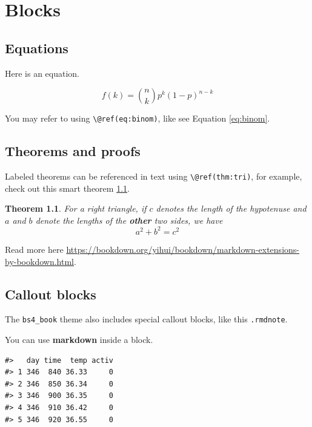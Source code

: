 \documentclass[
  12pt,
  a4paper,
  extrafontsizes,
  onecolumn,
  openright]{book}
\newtheorem{theorem}{Theorem}[chapter]
\theoremstyle{definition}
\theoremstyle{definition}
\theoremstyle{definition}
\theoremstyle{definition}
\theoremstyle{remark}
\begin{document}
\hypertarget{blocks}{%
\chapter{Blocks}\label{blocks}}

\hypertarget{equations}{%
\section{Equations}\label{equations}}

Here is an equation.

\begin{equation} 
  f\left(k\right) = \binom{n}{k} p^k\left(1-p\right)^{n-k}
  \label{eq:binom}
\end{equation}

You may refer to using \texttt{\textbackslash{}@ref(eq:binom)}, like see Equation \eqref{eq:binom}.

\hypertarget{theorems-and-proofs}{%
\section{Theorems and proofs}\label{theorems-and-proofs}}

Labeled theorems can be referenced in text using \texttt{\textbackslash{}@ref(thm:tri)}, for example, check out this smart theorem \ref{thm:tri}.

\begin{theorem}
\protect\hypertarget{thm:tri}{}\label{thm:tri}For a right triangle, if \(c\) denotes the \emph{length} of the hypotenuse
and \(a\) and \(b\) denote the lengths of the \textbf{other} two sides, we have
\[a^2 + b^2 = c^2\]
\end{theorem}

Read more here \url{https://bookdown.org/yihui/bookdown/markdown-extensions-by-bookdown.html}.

\hypertarget{callout-blocks}{%
\section{Callout blocks}\label{callout-blocks}}

The \texttt{bs4\_book} theme also includes special callout blocks, like this \texttt{.rmdnote}.

You can use \textbf{markdown} inside a block.

\begin{verbatim}
#>   day time  temp activ
#> 1 346  840 36.33     0
#> 2 346  850 36.34     0
#> 3 346  900 36.35     0
#> 4 346  910 36.42     0
#> 5 346  920 36.55     0
\end{verbatim}
\end{document}
